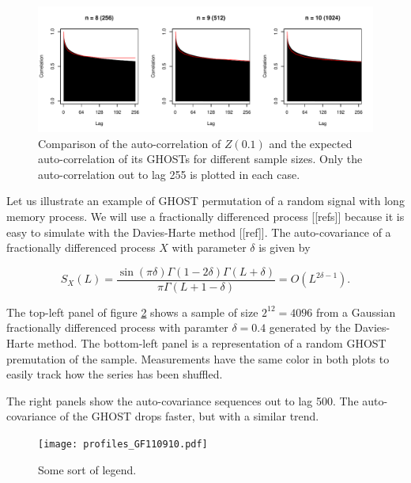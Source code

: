 \documentclass[12pt]{article}
\begin{document}
  \begin{figure}[t] 
  \centering
  \includegraphics[scale=.7]{practical-long-mem-2_GF110907.pdf}
  \caption{Comparison of the auto-correlation of $Z(0.1)$ and the
  expected auto-correlation of its GHOSTs for different sample sizes.
  Only the auto-correlation out to lag 255 is plotted in each case.}
  \label{longmem1}
  \end{figure}

  Let us illustrate an example of GHOST permutation of a random
  signal with long memory process. We will use a fractionally
  differenced process [[refs]] because it is easy to simulate with
  the Davies-Harte method [[ref]]. The auto-covariance of a 
  fractionally differenced process $X$ with parameter $\delta$
  is given by

  \begin{equation*}
     S_X(L) = \frac{\sin(\pi\delta) \Gamma(1-2\delta) \Gamma(L +
       \delta)}{\pi \Gamma(L + 1 - \delta)}
     = O(L^{2\delta -1}).
  \end{equation*}

 
  
  The top-left panel of figure \ref{profiles} shows a sample of size
  $2^{12}=4096$ from a Gaussian fractionally differenced process with
  paramter $\delta = 0.4$ generated by the Davies-Harte method. The
  bottom-left panel is a representation of a random GHOST premutation
  of the sample. Measurements have the same color in both plots
  to easily track how the series has been shuffled.

  The right panels show the auto-covariance sequences out to lag 500.
  The auto-covariance of the GHOST drops faster, but with a similar
  trend.


  
  \begin{figure}[t] 
  \centering
  \texttt{[image: profiles\_GF110910.pdf]}
  \caption{
  Some sort of legend.
  }
  \label{profiles}
  \end{figure}
\end{document}
